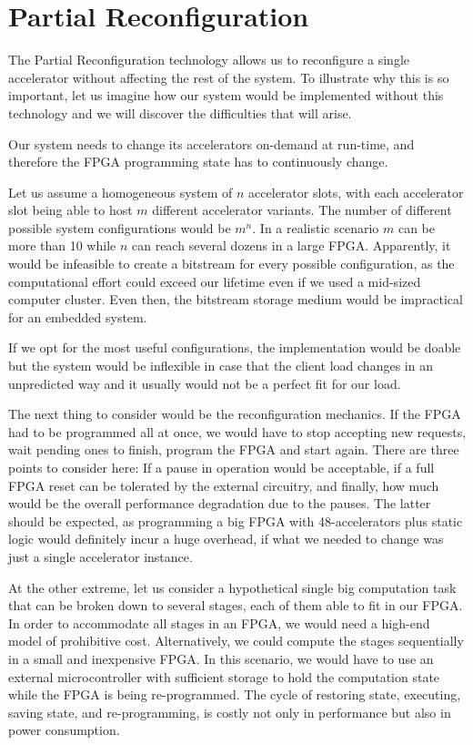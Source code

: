 \section{Partial Reconfiguration}

The Partial Reconfiguration technology allows us to reconfigure a single accelerator without affecting
the rest of the system. To illustrate why this is so important, let us imagine how our system would be
implemented without this technology and we will discover the difficulties that will arise.

Our system needs to change its accelerators on-demand at run-time,
and therefore the FPGA programming state has to continuously change.

Let us assume a homogeneous system of $n$ accelerator slots, with each accelerator slot being able
to host $m$ different accelerator variants. The number of different possible system configurations
would be $m^n$. In a realistic scenario $m$ can be more than 10 while $n$ can reach several dozens
in a large FPGA.
Apparently, it would be infeasible to create a bitstream for every possible configuration,
as the computational effort could exceed our lifetime even if we used a mid-sized computer cluster. 
Even then, the bitstream storage medium would be impractical for an embedded system.

If we opt for the most useful configurations, the implementation would be doable but the system would
be inflexible in case that the client load changes in an unpredicted way and it usually would not be a perfect fit
for our load.

The next thing to consider would be the reconfiguration mechanics.
If the FPGA had to be programmed all at once, we would have to
stop accepting new requests, wait pending ones to finish, program the FPGA and start again.
There are three points to consider here: If a pause in operation would be acceptable, if a full FPGA reset
can be tolerated by the external circuitry,
and finally, how much would be the overall performance degradation due to the pauses.
The latter should be expected, as programming a big FPGA with 48-accelerators plus static logic
would definitely incur a huge overhead, if what we needed to change was just a single accelerator instance.

At the other extreme, let us consider a hypothetical single big computation task
that can be broken down to several stages, each of them able to fit in our FPGA.
In order to accommodate all stages in an FPGA, we would need a high-end model of prohibitive cost.
Alternatively, we could compute the stages sequentially in a small and inexpensive FPGA.
In this scenario, we would have to use an external microcontroller with sufficient storage
to hold the computation state while the FPGA is being re-programmed.
The cycle of restoring state, executing, saving state, and re-programming,
is costly not only in performance but also in power consumption.

